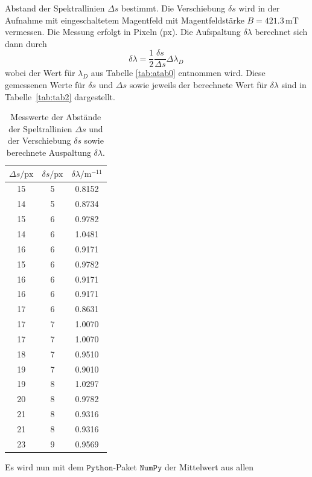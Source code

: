 Abstand der Spektrallinien $\Delta s$ bestimmt. Die Verschiebung $\delta s$ wird in der Aufnahme mit eingeschaltetem 
Magentfeld mit Magentfeldstärke $B = 421.3 \,\si{\milli\tesla}$ vermessen. Die Messung erfolgt in Pixeln (px).
Die Aufspaltung $\delta \lambda$ berechnet 
sich dann durch
\begin{equation}
    \label{eq:Auswertung}
    \delta \lambda = \frac{1}{2} \frac{\delta s}{\Delta s} \Delta \lambda_D \,
\end{equation}
wobei der Wert für $\lambda_D$ aus Tabelle \ref{tab:atab0} entnommen wird. 
Diese gemessenen Werte für $\delta s$ und $\Delta s$ sowie jeweils der berechnete Wert für $\delta \lambda$ sind in Tabelle \ref{tab:tab2} dargestellt.
\FloatBarrier
\begin{table}[h]
    \centering
    \caption{Messwerte der Abstände der Speltrallinien $\Delta s$ und der Verschiebung $\delta s$ sowie berechnete Auspaltung $\delta \lambda$.}
    \label{tab:atab2}
    \begin{tabular}{c c c}
        \toprule
        {$\Delta s / \text{px}$} & {$\delta s / \text{px}$} & {$\delta \lambda / \si{\meter}^{-11}$}\\
        \midrule
        15 & 5 & 0.8152 \\ 
        14 & 5 & 0.8734 \\
        15 & 6 & 0.9782 \\
        14 & 6 & 1.0481 \\
        16 & 6 & 0.9171 \\
        15 & 6 & 0.9782 \\
        16 & 6 & 0.9171 \\ 
        16 & 6 & 0.9171 \\
        17 & 6 & 0.8631 \\ 
        17 & 7 & 1.0070 \\ 
        17 & 7 & 1.0070 \\
        18 & 7 & 0.9510 \\
        19 & 7 & 0.9010 \\
        19 & 8 & 1.0297 \\
        20 & 8 & 0.9782 \\
        21 & 8 & 0.9316 \\
        21 & 8 & 0.9316 \\
        23 & 9 & 0.9569 \\
        \bottomrule
    \end{tabular}
\end{table}
\FloatBarrier
\noindent
Es wird nun mit dem $\texttt{Python}$-Paket $\texttt{NumPy}$ der Mittelwert aus allen
